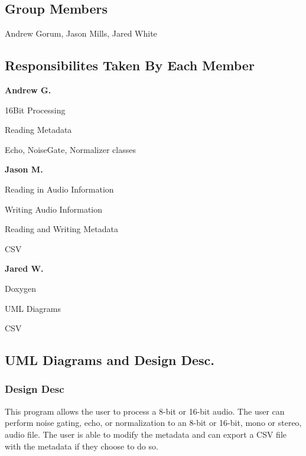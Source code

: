 \subsection*{Group Members}

Andrew Gorum, Jason Mills, Jared White

\subsection*{Responsibilites Taken By Each Member}

{\bfseries Andrew G.}
\begin{DoxyEnumerate}
\item 16\+Bit Processing
\item Reading Metadata
\item Echo, Noise\+Gate, Normalizer classes
\end{DoxyEnumerate}

{\bfseries Jason M.}
\begin{DoxyEnumerate}
\item Reading in Audio Information
\item Writing Audio Information
\item Reading and Writing Metadata
\item C\+SV
\end{DoxyEnumerate}

{\bfseries Jared W.}
\begin{DoxyEnumerate}
\item Doxygen
\item U\+ML Diagrams
\item C\+SV
\end{DoxyEnumerate}

\subsection*{U\+ML Diagrams and Design Desc.}



\subsubsection*{Design Desc}

This program allows the user to process a 8-\/bit or 16-\/bit audio. The user can perform noise gating, echo, or normalization to an 8-\/bit or 16-\/bit, mono or stereo, audio file. The user is able to modify the metadata and can export a C\+SV file with the metadata if they choose to do so.

